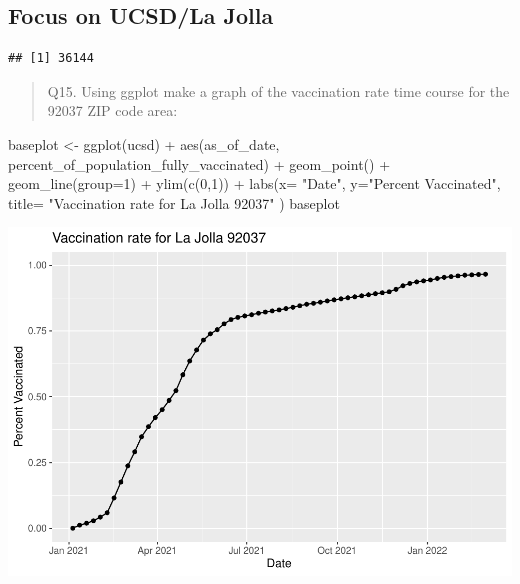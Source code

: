 \documentclass[
]{article}
\newenvironment{Shaded}{\begin{snugshade}}{\end{snugshade}}
\newcommand{\AttributeTok}[1]{\textcolor[rgb]{0.77,0.63,0.00}{#1}}
\newcommand{\DecValTok}[1]{\textcolor[rgb]{0.00,0.00,0.81}{#1}}
\newcommand{\FunctionTok}[1]{\textcolor[rgb]{0.00,0.00,0.00}{#1}}
\newcommand{\NormalTok}[1]{#1}
\newcommand{\OtherTok}[1]{\textcolor[rgb]{0.56,0.35,0.01}{#1}}
\newcommand{\SpecialCharTok}[1]{\textcolor[rgb]{0.00,0.00,0.00}{#1}}
\newcommand{\StringTok}[1]{\textcolor[rgb]{0.31,0.60,0.02}{#1}}
\begin{document}
\hypertarget{focus-on-ucsdla-jolla}{%
\subsection{Focus on UCSD/La Jolla}\label{focus-on-ucsdla-jolla}}

\begin{Shaded}
\end{Shaded}

\begin{verbatim}
## [1] 36144
\end{verbatim}

\begin{quote}
Q15. Using ggplot make a graph of the vaccination rate time course for
the 92037 ZIP code area:
\end{quote}

\begin{Shaded}
\begin{Highlighting}[]
\NormalTok{baseplot }\OtherTok{\textless{}{-}} \FunctionTok{ggplot}\NormalTok{(ucsd) }\SpecialCharTok{+}
  \FunctionTok{aes}\NormalTok{(as\_of\_date,}
\NormalTok{      percent\_of\_population\_fully\_vaccinated) }\SpecialCharTok{+}
  \FunctionTok{geom\_point}\NormalTok{() }\SpecialCharTok{+}
  \FunctionTok{geom\_line}\NormalTok{(}\AttributeTok{group=}\DecValTok{1}\NormalTok{) }\SpecialCharTok{+}
  \FunctionTok{ylim}\NormalTok{(}\FunctionTok{c}\NormalTok{(}\DecValTok{0}\NormalTok{,}\DecValTok{1}\NormalTok{)) }\SpecialCharTok{+}
  \FunctionTok{labs}\NormalTok{(}\AttributeTok{x=} \StringTok{"Date"}\NormalTok{, }\AttributeTok{y=}\StringTok{"Percent Vaccinated"}\NormalTok{, }\AttributeTok{title=} \StringTok{"Vaccination rate for La Jolla 92037"}\NormalTok{ )}
\NormalTok{baseplot}
\end{Highlighting}
\end{Shaded}

\includegraphics{COVID-19-Vax-mini-project_files/figure-latex/unnamed-chunk-29-1.pdf}
\end{document}
